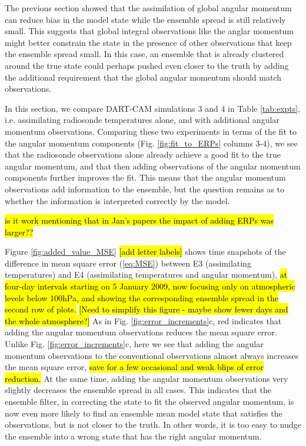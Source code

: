 

The previous section showed that the assimilation of global angular momentum can reduce bias in the model state while the ensemble spread is still relatively small.
This suggests that global integral observations like the anglar momentum might better constrain the state in the presence of other observations that keep the ensemble spread small. 
In this case, an ensemble that is already clustered around the true state could perhaps pushed even closer to the truth by adding the additional requirement that the global angular momentum should match observations. 

In this section, we compare DART-CAM simulations 3 and 4 in Table \ref{tab:expts}, i.e. assimilating radiosonde temperatures alone, and with additional angular momentum observations.
Comparing these two experiments in terms of the fit to the angular momentum components (Fig. \ref{fig:fit_to_ERPs} columns 3-4), we see that the radiosonde observations alone already achieve a good fit to the true angular momentum, and that 
then adding observations of the angular momentum components further improves the fit.  
This means that the angular momentum observations add information to the ensemble, but the question remains as to whether the information is interpreted correctly by the model.

\hl{is it work mentioning that in Jan's papers the impact of adding ERPs was larger??}

Figure \ref{fig:added_value_MSE} \hl{[add letter labels]} shows time snapshots of the difference in mean square error (\ref{eq:MSE}) between E3 (assimilating temperatures) and E4 (assimilating temperatures and angular momentum), \hl{at four-day intervals starting on 5 January 2009, now focusing only on atmospheric levels below 100hPa, and showing the corresponding ensemble spread in the second row of plots.} 
\hl{[Need to simplify this figure - maybe show fewer days and the whole atmosphere?]}
As in Fig.  \ref{fig:error_increments}c, red indicates that adding the angular momentum observations reduces the mean square error. 
Unlike Fig.  \ref{fig:error_increments}c, here we see that adding the angular momentum observations to the conventional observations almost always increases the mean square error, \hl{save for a few occasional and weak blips of error reduction.}
At the same time, adding the angular momentum observations very slightly decreases the ensemble spread in all cases.
This indicates that the ensemble filter, in correcting the state to fit the observed angular momentum, is now even more likely to find an ensemble mean model state that satisfies the observations, but is not closer to the truth. 
In other words, it is too easy to nudge the ensemble into a wrong state that has the right angular momentum. 

